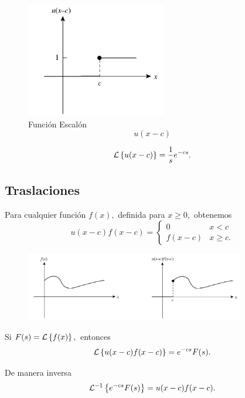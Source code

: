 	\begin{figure}
		\centering
		\includegraphics[height=5cm,keepaspectratio=true]{./edo/img0402.png}
		\caption{Función Escalón $$u(x-c)$$}
		\label{fig:0402}
	\end{figure}
	



	\begin{teorema}
		\label{bron:thm:23.3}
		$$
		\mathcal{L}\left\{ u(x-c) \right\}=\dfrac{1}{s}e^{-cs}.
		$$
	\end{teorema}


\subsection{Traslaciones}


	Para cualquier funci\'on $f(x),$ definida para $x\geq0,$ obtenemos
	$$
	u(x-c)f(x-c)=
	\begin{cases}
	0 & x<c \\
	f(x-c) & x\geq c.
	\end{cases}
	$$



	\begin{figure}
		\centering
		\includegraphics[height=3cm,keepaspectratio=true]{./edo/img0403.png}
		\label{fig:0403}
	\end{figure}
	



	\begin{teorema}
		\label{bron:thm:23.4}
		Si $F(s)=\mathcal{L}\left\{ f(x) \right\},$ entonces
		$$
		\mathcal{L}\left\{ u(x-c)f(x-c) \right\}=e^{-cs}F(s).
		$$
		
		De manera inversa
		$$\mathcal{L}^{-1}\left\{ e^{-cs}F(s) \right\}=u(x-c)f(x-c).$$
	\end{teorema}
	


